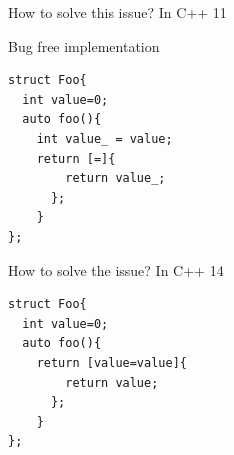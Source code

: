 \documentclass[10pt]{beamer}
\begin{document}
\begin{frame}[fragile]{How to solve this issue?}
	\centering \alert{In C++ 11}

	 Bug free implementation

	\vfill

	\begin{verbatim}
struct Foo{
  int value=0;
  auto foo(){
    int value_ = value;
    return [=]{
        return value_;
      };
    }
};
	\end{verbatim}

\end{frame}

\begin{frame}[fragile]{How to solve the issue?}
	\centering \alert{In C++ 14}

	\begin{verbatim}
struct Foo{
  int value=0;
  auto foo(){
    return [value=value]{
        return value;
      };
    }
};
	\end{verbatim}
\end{frame}
\end{document}
